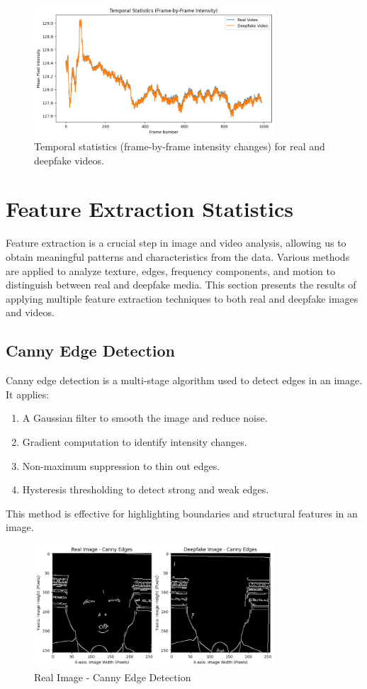 \documentclass{article}
\begin{document}
\begin{figure}[h!]
    \centering
    \includegraphics[width=0.8\textwidth]{temporal_statistics.png}
    \caption{Temporal statistics (frame-by-frame intensity changes) for real and deepfake videos.}
    \label{fig:temporal}
\end{figure}

\section{Feature Extraction Statistics}
Feature extraction is a crucial step in image and video analysis, allowing us to obtain meaningful patterns and characteristics from the data. Various methods are applied to analyze texture, edges, frequency components, and motion to distinguish between real and deepfake media. This section presents the results of applying multiple feature extraction techniques to both real and deepfake images and videos.

\subsection{Canny Edge Detection}
Canny edge detection is a multi-stage algorithm used to detect edges in an image. It applies:
\begin{enumerate}
    \item A Gaussian filter to smooth the image and reduce noise.
    \item Gradient computation to identify intensity changes.
    \item Non-maximum suppression to thin out edges.
    \item Hysteresis thresholding to detect strong and weak edges.
\end{enumerate}
This method is effective for highlighting boundaries and structural features in an image.

\begin{figure}[h!]
    \centering
    \includegraphics[width=0.8\textwidth]{real_canny.png}
    \caption{Real Image - Canny Edge Detection}
    \label{fig:real_canny}
\end{figure}
\end{document}
